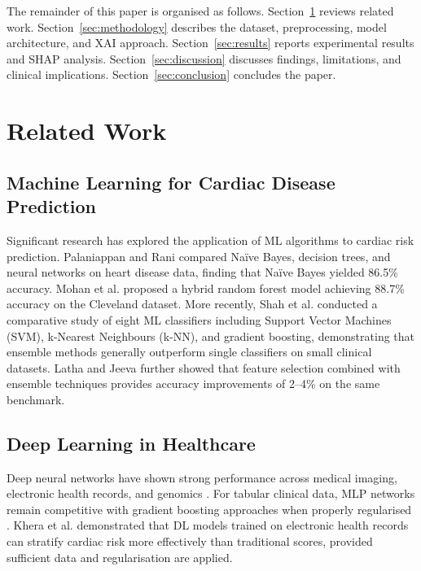 \documentclass[conference]{IEEEtran}
\begin{document}
The remainder of this paper is organised as follows. Section~\ref{sec:related} reviews related work. Section~\ref{sec:methodology} describes the dataset, preprocessing, model architecture, and XAI approach. Section~\ref{sec:results} reports experimental results and SHAP analysis. Section~\ref{sec:discussion} discusses findings, limitations, and clinical implications. Section~\ref{sec:conclusion} concludes the paper.

\section{Related Work}
\label{sec:related}

\subsection{Machine Learning for Cardiac Disease Prediction}

Significant research has explored the application of ML algorithms to cardiac risk prediction. Palaniappan and Rani \cite{palaniappan2008intelligent} compared Naïve Bayes, decision trees, and neural networks on heart disease data, finding that Naïve Bayes yielded 86.5\% accuracy. Mohan et al. \cite{mohan2019effective} proposed a hybrid random forest model achieving 88.7\% accuracy on the Cleveland dataset. More recently, Shah et al. \cite{shah2020heart} conducted a comparative study of eight ML classifiers including Support Vector Machines (SVM), k-Nearest Neighbours (k-NN), and gradient boosting, demonstrating that ensemble methods generally outperform single classifiers on small clinical datasets. Latha and Jeeva \cite{latha2019improving} further showed that feature selection combined with ensemble techniques provides accuracy improvements of 2–4\% on the same benchmark.

\subsection{Deep Learning in Healthcare}

Deep neural networks have shown strong performance across medical imaging, electronic health records, and genomics \cite{esteva2019guide}. For tabular clinical data, MLP networks remain competitive with gradient boosting approaches when properly regularised \cite{gorishniy2021revisiting}. Khera et al. \cite{khera2021supervised} demonstrated that DL models trained on electronic health records can stratify cardiac risk more effectively than traditional scores, provided sufficient data and regularisation are applied.
\end{document}
